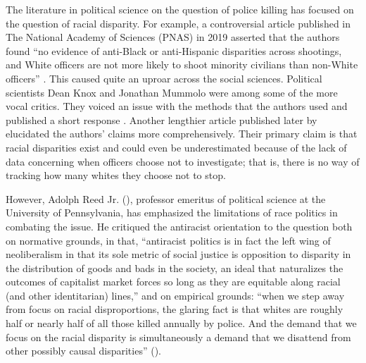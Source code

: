 \documentclass[12pt]{article}
\begin{document}
The literature in political science on the question of police killing has focused on the question of racial disparity. For example, a controversial article published in The National Academy of Sciences (PNAS) in 2019 asserted that the authors found “no evidence of anti-Black or anti-Hispanic disparities across shootings, and White officers are not more likely to shoot minority civilians than non-White officers” \parencite[15877]{johnsonOfficerCharacteristicsRacial2019}. This caused quite an uproar across the social sciences. Political scientists Dean Knox and Jonathan Mummolo were among some of the more vocal critics. They voiced an issue with the methods that the authors used and published a short response \parencite{knoxMakingInferencesRacial2020}. Another lengthier article published later by \textcite{knoxAdministrativeRecordsMask2020} elucidated the authors’ claims more comprehensively. Their primary claim is that racial disparities exist and could even be underestimated because of the lack of data concerning when officers choose not to investigate; that is, there is no way of tracking how many whites they choose not to stop.

However, Adolph Reed Jr. (\citeyear{reedHowRacialDisparity2016}), professor emeritus of political science at the University of Pennsylvania, has emphasized the limitations of race politics in combating the issue. He critiqued the antiracist orientation to the question both on normative grounds, in that, “antiracist politics is in fact the left wing of neoliberalism in that its sole metric of social justice is opposition to disparity in the distribution of goods and bads in the society, an ideal that naturalizes the outcomes of capitalist market forces so long as they are equitable along racial (and other identitarian) lines,” and on empirical grounds: “when we step away from focus on racial disproportions, the glaring fact is that whites are roughly half or nearly half of all those killed annually by police. And the demand that we focus on the racial disparity is simultaneously a demand that we disattend from other possibly causal disparities” (\cite{reedHowRacialDisparity2016}).
\end{document}
